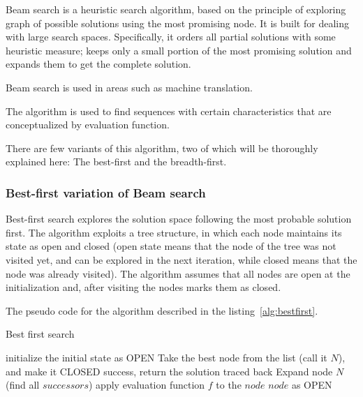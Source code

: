 Beam search is a heuristic search algorithm, based on the principle of exploring graph of possible solutions using the most promising node. It is built for dealing with large search spaces. Specifically, it orders all partial solutions with some heuristic measure; keeps only a small portion of the most promising solution and expands them to get the complete solution.

Beam search is used in areas such as machine translation\cite{Koehn2007MOSEStranslationSystem}.

The algorithm is used to find sequences with certain characteristics that are conceptualized by evaluation function.

There are few variants of this algorithm, two of which will be thoroughly explained here: The best-first and the breadth-first. 

\subsubsection{Best-first variation of Beam search}

Best-first search explores the solution space following the most probable solution first. The algorithm exploits a tree structure, in which each node maintains its state as open and closed (open state means that the node of the tree was not visited yet, and can be explored in the next iteration, while closed means that the node was already visited). The algorithm assumes that all nodes are open at the initialization and, after visiting the nodes marks them as closed. 

The pseudo code for the algorithm described in the listing~\ref{alg:bestfirst}.


\begin{algorithm}
	\caption{Best first search}
	\label{alg:bestfirst}
	\begin{algorithmic}[1]
		\State initialize the initial state as OPEN
			\State Take the best node from the list (call it $N$), and make it CLOSED
				\State	success, return the solution traced back
			\EndIf
			\State Expand node $N$ (find all $successors$)
				\State apply evaluation function $f$ to the $node$\;
				\State $node$ as OPEN
			\EndIf
			\EndFor			
		\EndWhile
		
		
	\end{algorithmic}
\end{algorithm}


